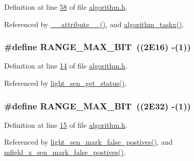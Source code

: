 Definition at line \hyperlink{a00021_source_l00058}{58} of file \hyperlink{a00021_source}{algorithm.\+h}.



Referenced by \hyperlink{a00030_source_l00658}{\+\_\+\+\_\+attribute\+\_\+\+\_\+()}, and \hyperlink{a00038_source_l01905}{algorithm\+\_\+taskx()}.

\hypertarget{a00021_ae01726ef8ba0a9e1fe8655dc382ecda8}{
\subsubsection[{R\+A\+N\+G\+E\+\_\+\+M\+A\+X\+\_\+16\+B\+I\+T}]{\setlength{\rightskip}{0pt plus 5cm}\#define R\+A\+N\+G\+E\+\_\+\+M\+A\+X\+\_\+B\+I\+T~((2\+E16) -\/(1))}}\label{a00021_ae01726ef8ba0a9e1fe8655dc382ecda8}


Definition at line \hyperlink{a00021_source_l00014}{14} of file \hyperlink{a00021_source}{algorithm.\+h}.



Referenced by \hyperlink{a00047_source_l00204}{light\+\_\+sen\+\_\+get\+\_\+status()}.

\hypertarget{a00021_a334bd006b6d2b397dbfc620d62c3c35c}{
\subsubsection[{R\+A\+N\+G\+E\+\_\+\+M\+A\+X\+\_\+32\+B\+I\+T}]{\setlength{\rightskip}{0pt plus 5cm}\#define R\+A\+N\+G\+E\+\_\+\+M\+A\+X\+\_\+B\+I\+T~((2\+E32) -\/(1))}}\label{a00021_a334bd006b6d2b397dbfc620d62c3c35c}


Definition at line \hyperlink{a00021_source_l00015}{15} of file \hyperlink{a00021_source}{algorithm.\+h}.



Referenced by \hyperlink{a00047_source_l00491}{light\+\_\+sen\+\_\+mark\+\_\+false\+\_\+postives()}, and \hyperlink{a00053_source_l00747}{mfield\+\_\+z\+\_\+sen\+\_\+mark\+\_\+false\+\_\+postives()}.

